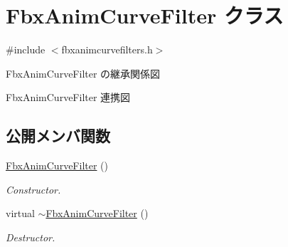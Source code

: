 \hypertarget{class_fbx_anim_curve_filter}{}\section{Fbx\+Anim\+Curve\+Filter クラス}
\label{class_fbx_anim_curve_filter}


{\ttfamily \#include $<$fbxanimcurvefilters.\+h$>$}



Fbx\+Anim\+Curve\+Filter の継承関係図


Fbx\+Anim\+Curve\+Filter 連携図
\subsection*{公開メンバ関数}
\begin{DoxyCompactItemize}
\item 
\hyperlink{class_fbx_anim_curve_filter_ac908ea01d9d49a263be450e760dabcce}{Fbx\+Anim\+Curve\+Filter} ()
\begin{DoxyCompactList}\small\item\em Constructor. \end{DoxyCompactList}\item 
virtual \hyperlink{class_fbx_anim_curve_filter_adafe5c10e506cabca6410869f53602bc}{$\sim$\+Fbx\+Anim\+Curve\+Filter} ()
\begin{DoxyCompactList}\small\item\em Destructor. \end{DoxyCompactList}\end{DoxyCompactItemize}
